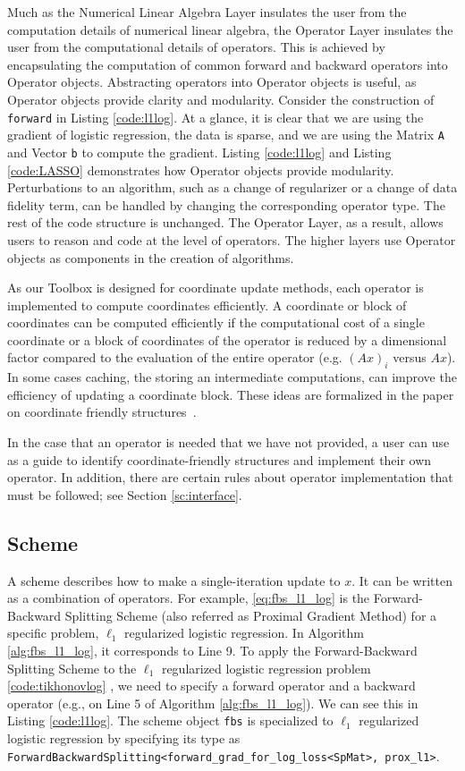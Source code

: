 Much as the Numerical Linear Algebra Layer insulates the user from the computation details of numerical linear algebra, the Operator Layer insulates the user from the computational details of operators. This is achieved by encapsulating the computation of common forward and backward operators into Operator objects. Abstracting operators into Operator objects is useful, as Operator objects provide clarity and modularity. Consider the construction of  \texttt{forward} in Listing \ref{code:l1log}. At a glance, it is clear that we are using the gradient of logistic regression, the data is sparse, and we are using the Matrix \texttt{A} and Vector \texttt{b} to compute the gradient. Listing \ref{code:l1log} and Listing \ref{code:LASSO} demonstrates how Operator objects provide modularity. Perturbations to an algorithm, such as a change of regularizer or a change of data fidelity term, can be handled by changing the corresponding operator type. The rest of the code structure is unchanged. The Operator Layer, as a result, allows users to reason and code at the level of operators.
The higher layers use Operator objects as components in the creation of algorithms.

As our Toolbox is designed for coordinate update methods, each operator is implemented to compute coordinates efficiently.
 A coordinate or block of coordinates can be computed efficiently if the computational cost of a single coordinate or a block of coordinates of the operator is reduced by a dimensional factor compared to the evaluation of the entire operator (e.g. $(Ax)_i$ versus $Ax$).
 In some cases caching, the storing an intermediate computations, can improve the efficiency of updating a coordinate block. These ideas are formalized in the paper on coordinate friendly structures~\citep{PengWuXuYanYin2016_coordinate}.

In the case that an operator is needed that we have not provided, a user can use~\citep{PengWuXuYanYin2016_coordinate} as a guide to identify coordinate-friendly structures and implement their own operator. In addition, there are certain rules about operator implementation that must be followed; see Section \ref{sc:interface}.


\subsection{Scheme}
A scheme describes how to make a single-iteration update to $x$.
It can be written as a combination of operators. For example, \eqref{eq:fbs_l1_log} is the Forward-Backward Splitting Scheme (also referred as Proximal Gradient Method) for a specific problem, $\ell_1$ regularized logistic regression. In Algorithm \ref{alg:fbs_l1_log}, it corresponds to Line 9. To apply the Forward-Backward Splitting Scheme to the $\ell_1$ regularized logistic regression problem \ref{code:tikhonovlog} , we need to specify a forward operator and a backward operator (e.g., on Line 5 of Algorithm \ref{alg:fbs_l1_log}). We can see this in Listing \ref{code:l1log}.
The scheme object \texttt{fbs} is specialized to $\ell_1$ regularized logistic regression by specifying its type as \texttt{ForwardBackwardSplitting<forward\_grad\_for\_log\_loss<SpMat>, prox\_l1>}.

